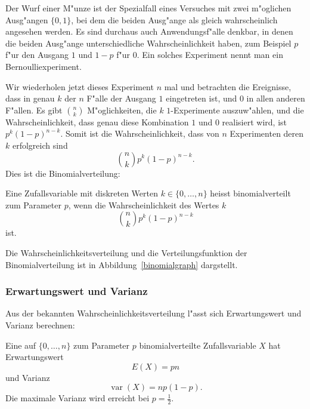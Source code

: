 Der Wurf einer M"unze ist der Spezialfall eines Versuches mit
zwei m"oglichen Ausg"angen $\{0,1\}$, bei dem die beiden Ausg"ange als
gleich wahrscheinlich angesehen werden.
Es sind durchaus auch
Anwendungsf"alle denkbar, in denen die beiden Ausg"ange unterschiedliche
Wahrscheinlichkeit haben, zum Beispiel $p$ f"ur den Ausgang $1$ und $1-p$
f"ur $0$.
Ein solches Experiment nennt man ein Bernoulliexperiment.

Wir wiederholen jetzt dieses Experiment $n$ mal und betrachten die Ereignisse,
dass in genau $k$ der $n$ F"alle der Ausgang $1$ eingetreten ist,
und $0$ in allen anderen F"allen.
Es gibt $\binom{n}{k}$ M"oglichkeiten,
die $k$ $1$-Experimente auszuw"ahlen, und die Wahrscheinlichkeit, dass genau
diese Kombination $1$ und $0$ realisiert wird, ist $p^k(1-p)^{n-k}$.
Somit ist die Wahrscheinlichkeit, dass von $n$ Experimenten deren $k$
erfolgreich sind
\[
\binom{n}{k}p^k(1-p)^{n-k}.
\]
Dies ist die Binomialverteilung:
\begin{definition}
Eine Zufallsvariable mit diskreten Werten $k\in\{0,\dots,n\}$
heisst binomialverteilt zum Parameter $p$, wenn die Wahrscheinlichkeit
des Wertes $k$ 
\[
\binom{n}{k}p^k(1-p)^{n-k}
\]
ist.
\end{definition}

Die Wahrscheinlichkeitsverteilung und die Verteilungsfunktion der
Binomialverteilung ist in Abbildung~\ref{binomialgraph} dargstellt.

\subsubsection{Erwartungswert und Varianz}
Aus der bekannten Wahrscheinlichkeitsverteilung l"asst sich
Erwartungswert und Varianz berechnen:
\begin{satz}
Eine auf $\{0,\dots,n\}$ zum Parameter $p$ binomialverteilte Zufallsvariable
$X$ hat Erwartungswert
\[
E(X)=pn
\]
und Varianz
\[
\operatorname{var}(X)=np(1-p).
\]
Die maximale Varianz wird erreicht bei $p=\frac12$.
\end{satz}


